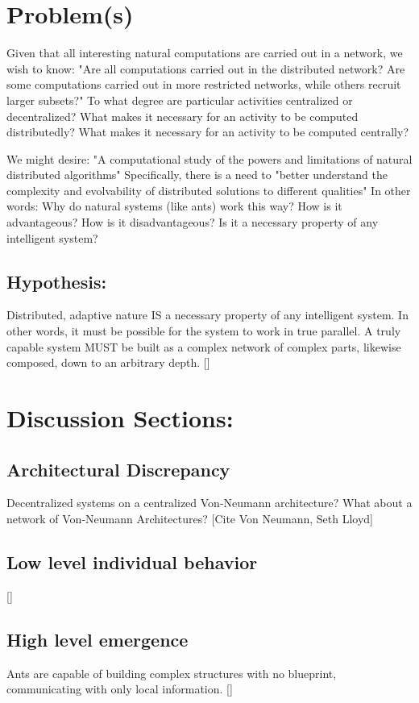 \documentclass{nature}
\begin{document}
\section{Problem(s)}

Given that all interesting natural computations are carried out in a network, we wish to know: 
"Are all computations carried out in the distributed network? Are some computations carried out in more restricted networks, while others recruit larger subsets?"
To what degree are particular activities centralized or decentralized?
What makes it necessary for an activity to be computed distributedly?
What makes it necessary for an activity to be computed centrally?

We might desire: "A computational study of the powers and limitations of natural distributed algorithms" Specifically, there is a need to "better understand the complexity and evolvability of distributed solutions to different qualities"
In other words: Why do natural systems (like ants) work this way?
How is it advantageous?
How is it disadvantageous?
Is it a necessary property of any intelligent system?

\subsection{Hypothesis:}
Distributed, adaptive nature IS a necessary property of any intelligent system.
In other words, it must be possible for the system to work in true parallel.
A truly capable system MUST be built as a complex network of complex parts, likewise composed, down to an arbitrary depth.
[]

\section{Discussion Sections:}
\subsection{Architectural Discrepancy}
    Decentralized systems on a centralized Von-Neumann architecture? What about a network of Von-Neumann Architectures?
    [Cite Von Neumann, Seth Lloyd]
\subsection{Low level individual behavior}
    []
\subsection{High level emergence}
    Ants are capable of building complex structures with no blueprint, communicating with only local information.
    []
\end{document}
